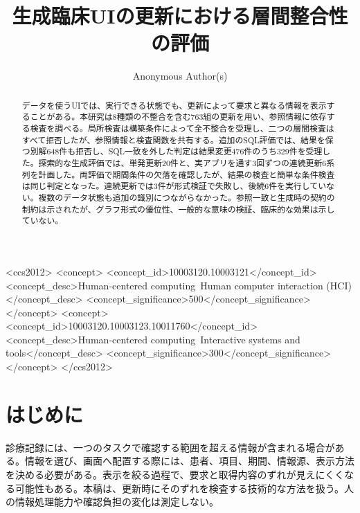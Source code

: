 \documentclass[manuscript,review,anonymous]{acmart}
\title{生成臨床UIの更新における層間整合性の評価}
\author{Anonymous Author(s)}
\begin{document}
\begin{abstract}
データを使うUIでは、実行できる状態でも、更新によって要求と異なる情報を表示することがある。本研究は8種類の不整合を含む763組の更新を用い、参照情報に依存する検査を調べる。局所検査は構築条件によって全不整合を受理し、二つの層間検査はすべて拒否したが、参照情報と検査関数を共有する。追加のSQL評価では、結果を保つ別解648件も拒否し、SQL一致を外した判定は結果変更476件のうち329件を受理した。探索的な生成評価では、単発更新20件と、実アプリを通す3回ずつの連続更新6系列を計画した。両評価で期間条件の欠落を確認したが、結果の検査と簡単な条件検査は同じ判定となった。連続更新では3件が形式検証で失敗し、後続6件を実行していない。複数のデータ状態も追加の識別につながらなかった。参照一致と生成時の契約の制約は示されたが、グラフ形式の優位性、一般的な意味の検証、臨床的な効果は示していない。
\end{abstract}

\begin{CCSXML}
<ccs2012>
  <concept>
    <concept_id>10003120.10003121</concept_id>
    <concept_desc>Human-centered computing~Human computer interaction (HCI)</concept_desc>
    <concept_significance>500</concept_significance>
  </concept>
  <concept>
    <concept_id>10003120.10003123.10011760</concept_id>
    <concept_desc>Human-centered computing~Interactive systems and tools</concept_desc>
    <concept_significance>300</concept_significance>
  </concept>
</ccs2012>
\end{CCSXML}



\maketitle

\section{はじめに}

診療記録には、一つのタスクで確認する範囲を超える情報が含まれる場合がある。情報を選び、画面へ配置する際には、患者、項目、期間、情報源、表示方法を決める必要がある。表示を絞る過程で、要求と取得内容のずれが見えにくくなる可能性もある。本稿は、更新時にそのずれを検査する技術的な方法を扱う。人の情報処理能力や確認負担の変化は測定しない。
\end{document}
